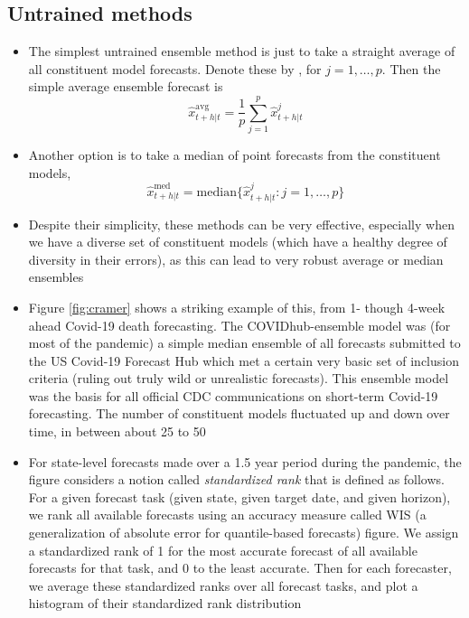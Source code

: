 \documentclass{article}
\begin{document}
\subsection{Untrained methods}

\begin{itemize}
\item The simplest untrained ensemble method is just to take a straight average
  of all constituent model forecasts. Denote these by
  , for $j = 1,\dots,p$. Then the simple average
  ensemble forecast is 
  \[
  \hat{x}^{\text{avg}}_{t+h|t} = \frac{1}{p} \sum_{j=1}^p \hat{x}^j_{t+h|t} 
  \] 

\item Another option is to take a median of point forecasts from the constituent
  models,
  \[
  \hat{x}^{\text{med}}_{t+h|t} = \mathrm{median}\Big\{ \hat{x}^j_{t+h|t} : j =
  1,\dots,p \Big\} 
  \]

\item Despite their simplicity, these methods can be very effective, especially
  when we have a diverse set of constituent models (which have a healthy degree
  of diversity in their errors), as this can lead to very robust average or
  median ensembles

\item Figure \ref{fig:cramer} shows a striking example of this, from 1- though
  4-week ahead Covid-19 death forecasting. The COVIDhub-ensemble model was (for
  most of the pandemic) a simple median ensemble of all forecasts submitted to
  the US Covid-19 Forecast Hub which met a certain very basic set of inclusion
  criteria (ruling out truly wild or unrealistic forecasts). This ensemble model
  was the basis for all official CDC communications on short-term Covid-19 
  forecasting. The number of constituent models fluctuated up and down over
  time, in between about 25 to 50  

\item For state-level forecasts made over a 1.5 year period during the pandemic, 
  the figure considers a notion called \emph{standardized rank} that is defined
  as follows. For a given forecast task (given state, given target date, and
  given horizon), we rank all available forecasts using an accuracy measure
  called WIS (a generalization of absolute error for quantile-based forecasts)
  figure. We assign a standardized rank of 1 for the most accurate forecast of
  all available forecasts for that task, and 0 to the least accurate. Then for
  each forecaster, we average these standardized ranks over all forecast tasks,
  and plot a histogram of their standardized rank distribution 


\end{itemize}
\end{document}
